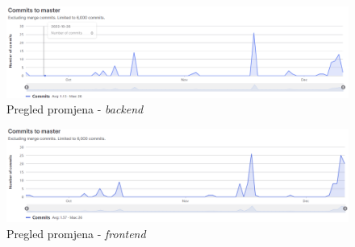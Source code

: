 		                  \begin{figure}[H]
                			\includegraphics[scale=0.4]{slike/backend_master.PNG} %
                			\centering
                			\caption{Pregled promjena - \textit{backend}}
                			
                		\end{figure}

                            \begin{figure}[H]
                			\includegraphics[scale=0.4]{slike/front_master.PNG} %
                			\centering
                			\caption{Pregled promjena - \textit{frontend}}
                			
                		\end{figure}
	